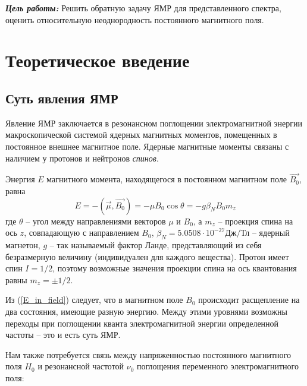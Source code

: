 \begin{center}
	\vspace{0.5cm}
	{\parbox{16cm}
		{\small{
			}
		}
	}
\end{center}

\textbf{\emph{Цель работы:}}
Решить обратную задачу ЯМР для представленного спектра, оценить относительную неоднородность постоянного магнитного поля.
\section{Теоретическое введение}
\subsection{Суть явления ЯМР}
Явление ЯМР заключается в резонансном поглощении электромагнитной энергии макроскопической системой ядерных магнитных моментов, помещенных в постоянное внешнее магнитное поле. Ядерные магнитные моменты связаны с наличием у протонов и нейтронов \textit{спинов}.

Энергия $E$ магнитного момента, находящегося в постоянном магнитном поле $\vec{B_0}$, равна
\begin{equation}
\label{E_in_field}
E = - (\vec{\mu}, \vec{B_0}) = -\mu B_0 \cos \theta = - g \beta_N B_0 m_z
\end{equation}
где $\theta$ -- угол между направлениями векторов $\mu$ и $B_0$, а $ m_z $ -- проекция спина на ось $z$, совпадающую с направлением $ B_0 $, $\beta_N = 5.0508 \cdot 10^{-27} \text{Дж}/\text{Тл}$ -- ядерный магнетон, $g$ -- так называемый фактор Ланде, представляющий из себя безразмерную величину (индивидуален для каждого вещества).
Протон имеет спин $ I = 1/2 $, поэтому возможные значения проекции спина на ось квантования равны $ m_z = \pm 1/2 $.

Из (\ref{E_in_field}) следует, что в магнитном поле $B_0$ происходит расщепление на два состояния, имеющие разную энергию.
Между этими уровнями возможны переходы при поглощении кванта электромагнитной энергии определенной частоты -- это и есть суть ЯМР.

Нам также потребуется связь между напряженностью постоянного магнитного поля $H_0$ и резонансной частотой $\nu_0$ поглощения переменного электромагнитного
поля: 

